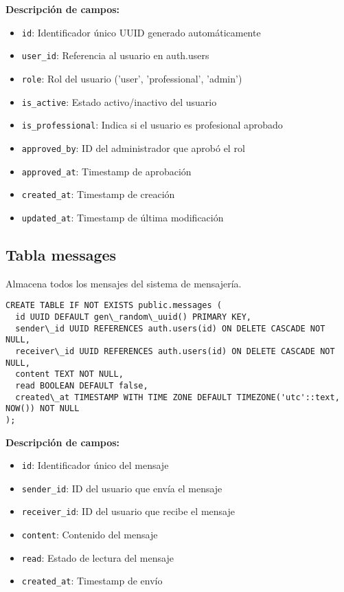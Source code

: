 \documentclass[12pt,a4paper]{article}
\begin{document}
\textbf{Descripción de campos:}
\begin{itemize}
    \item \texttt{id}: Identificador único UUID generado automáticamente
    \item \texttt{user\_id}: Referencia al usuario en auth.users
    \item \texttt{role}: Rol del usuario ('user', 'professional', 'admin')
    \item \texttt{is\_active}: Estado activo/inactivo del usuario
    \item \texttt{is\_professional}: Indica si el usuario es profesional aprobado
    \item \texttt{approved\_by}: ID del administrador que aprobó el rol
    \item \texttt{approved\_at}: Timestamp de aprobación
    \item \texttt{created\_at}: Timestamp de creación
    \item \texttt{updated\_at}: Timestamp de última modificación
\end{itemize}

\subsection{Tabla messages}

Almacena todos los mensajes del sistema de mensajería.

\begin{lstlisting}[caption=Estructura completa de messages]
CREATE TABLE IF NOT EXISTS public.messages (
  id UUID DEFAULT gen\_random\_uuid() PRIMARY KEY,
  sender\_id UUID REFERENCES auth.users(id) ON DELETE CASCADE NOT NULL,
  receiver\_id UUID REFERENCES auth.users(id) ON DELETE CASCADE NOT NULL,
  content TEXT NOT NULL,
  read BOOLEAN DEFAULT false,
  created\_at TIMESTAMP WITH TIME ZONE DEFAULT TIMEZONE('utc'::text, NOW()) NOT NULL
);
\end{lstlisting}

\textbf{Descripción de campos:}
\begin{itemize}
    \item \texttt{id}: Identificador único del mensaje
    \item \texttt{sender\_id}: ID del usuario que envía el mensaje
    \item \texttt{receiver\_id}: ID del usuario que recibe el mensaje
    \item \texttt{content}: Contenido del mensaje
    \item \texttt{read}: Estado de lectura del mensaje
    \item \texttt{created\_at}: Timestamp de envío
\end{itemize}
\end{document}
